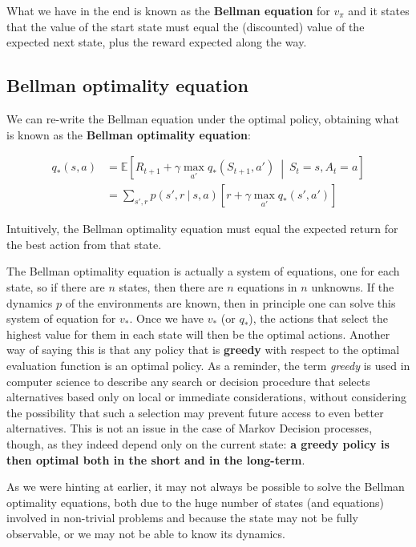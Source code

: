 What we have in the end is known as the \textbf{Bellman equation} for $v_\pi$ and it states that the value of the start state must equal the (discounted) value of the expected next state, plus the reward expected along the way.

\subsection{Bellman optimality equation}
We can re-write the Bellman equation under the optimal policy, obtaining what is known as the \textbf{Bellman optimality equation}:

\begin{equation}
    \begin{split}
        q_*(s,a) & = \mathbb{E} \left[ R_{t+1} + \gamma \max_{a'} q_* (S_{t+1}, a') \ \middle\vert \ S_t = s, A_t = a \right] \\
        & = \sum_{s', r} p(s',r \ \vert \ s,a) \left[ r + \gamma \max_{a'} q_*(s',a') \right]
    \end{split}
    \label{eq:ch2-bellmanoptimalityequation}
\end{equation}

Intuitively, the Bellman optimality equation must equal the expected return for the best action from that state. 

The Bellman optimality equation is actually a system of equations, one for each state, so if there are $n$ states, then there are $n$ equations in $n$ unknowns. If the dynamics $p$ of the environments are known, then in principle one can solve this system of equation for $v_*$. Once we have $v_*$ (or $q_*$), the actions that select the highest value for them in each state will then be the optimal actions. Another way of saying this is that any policy that is \textbf{greedy} with respect to the optimal evaluation function is an optimal policy. As a reminder, the term \textit{greedy} is used in computer science to describe any search or decision procedure that selects alternatives based only on local or immediate considerations, without considering the possibility that such a selection may prevent future access to even better alternatives. This is not an issue in the case of Markov Decision processes, though, as they indeed depend only on the current state: \textbf{a greedy policy is then optimal both in the short and in the long-term}.

As we were hinting at earlier, it may not always be possible to solve the Bellman optimality equations, both due to the huge number of states (and equations) involved in non-trivial problems and because the state may not be fully observable, or we may not be able to know its dynamics.

